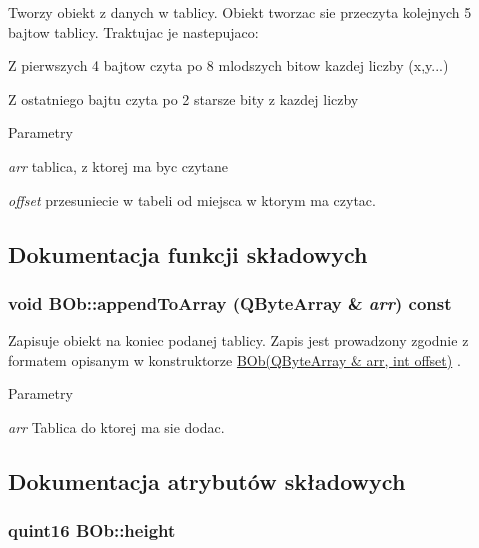 Tworzy obiekt z danych w tablicy. Obiekt tworzac sie przeczyta kolejnych 5 bajtow tablicy. Traktujac je nastepujaco:

\begin{DoxyItemize}
\item Z pierwszych 4 bajtow czyta po 8 mlodszych bitow kazdej liczby (x,y...) \item Z ostatniego bajtu czyta po 2 starsze bity z kazdej liczby\end{DoxyItemize}

\begin{DoxyParams}{Parametry}
\item[{\em arr}]tablica, z ktorej ma byc czytane \item[{\em offset}]przesuniecie w tabeli od miejsca w ktorym ma czytac. \end{DoxyParams}


\subsection{Dokumentacja funkcji składowych}
\hypertarget{class_b_ob_a11fbd7ab4c8dda600232b40b02a20cbe}{
\subsubsection[{appendToArray}]{\setlength{\rightskip}{0pt plus 5cm}void BOb::appendToArray (QByteArray \& {\em arr}) const}}
\label{class_b_ob_a11fbd7ab4c8dda600232b40b02a20cbe}


Zapisuje obiekt na koniec podanej tablicy. Zapis jest prowadzony zgodnie z formatem opisanym w konstruktorze \hyperlink{class_b_ob_ab71739ff83cf58d15b42f26274c583d1}{BOb(QByteArray \& arr, int offset)} .


\begin{DoxyParams}{Parametry}
\item[{\em arr}]Tablica do ktorej ma sie dodac. \end{DoxyParams}


\subsection{Dokumentacja atrybutów składowych}
\hypertarget{class_b_ob_ac406681bc6029dc6e41aa53791e9f210}{
\subsubsection[{height}]{\setlength{\rightskip}{0pt plus 5cm}quint16 {\bf BOb::height}}}
\label{class_b_ob_ac406681bc6029dc6e41aa53791e9f210}


